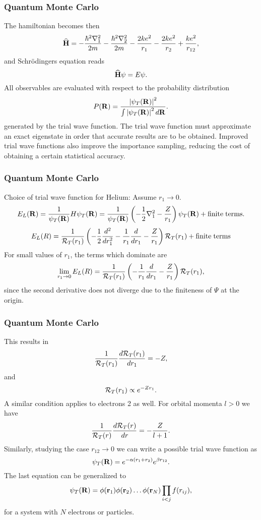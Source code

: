 \documentclass[compress]{beamer}
\newcommand{\OP}[1]{{\bf\widehat{#1}}}
\begin{document}
\frame
{
  \frametitle{Quantum Monte Carlo}
\begin{small}
{\scriptsize
The hamiltonian becomes then
\[
   \OP{H}=-\frac{\hbar^2\nabla_1^2}{2m}-\frac{\hbar^2\nabla_2^2}{2m}
          -\frac{2ke^2}{r_1}-\frac{2ke^2}{r_2}+
               \frac{ke^2}{r_{12}},
\]
and  Schr\"odingers equation reads
\[
   \OP{H}\psi=E\psi.
\]
All observables are evaluated with respect to the probability distribution
\[
   P({\bf R})= \frac{\left|\psi_T({\bf R})\right|^2}{\int \left|\psi_T({\bf R})\right|^2d{\bf R}}.
\]
generated by the trial wave function.   
The trial wave function must approximate an exact 
eigenstate in order that accurate results are to be obtained. 
Improved trial
wave functions also improve the importance sampling, 
reducing the cost of obtaining a certain statistical accuracy. 
}
\end{small}
}


\frame
{
  \frametitle{Quantum Monte Carlo}
\begin{small}
{\scriptsize
Choice of trial wave function for Helium:
Assume $r_1 \rightarrow 0$.
\[
   E_L({\bf R})=\frac{1}{\psi_T({\bf R})}H\psi_T({\bf R})=
     \frac{1}{\psi_T({\bf R})}\left(-\frac{1}{2}\nabla^2_1
     -\frac{Z}{r_1}\right)\psi_T({\bf R}) + \mathrm{finite \hspace{0.1cm}terms}.
\]
\[ 
    E_L(R)=
    \frac{1}{{\cal R}_T(r_1)}\left(-\frac{1}{2}\frac{d^2}{dr_1^2}-
     \frac{1}{r_1}\frac{d}{dr_1}
     -\frac{Z}{r_1}\right){\cal R}_T(r_1) + \mathrm{finite\hspace{0.1cm} terms}
\]
For small values of $r_1$, the terms which dominate are
\[ 
    \lim_{r_1 \rightarrow 0}E_L(R)=
    \frac{1}{{\cal R}_T(r_1)}\left(-
     \frac{1}{r_1}\frac{d}{dr_1}
     -\frac{Z}{r_1}\right){\cal R}_T(r_1),
\]
since the second derivative does not diverge due to the finiteness of 
$\Psi$ at the origin.
}
\end{small}
}


\frame
{
\frametitle{Quantum Monte Carlo}
\begin{small}
{\scriptsize
This results in
\[
     \frac{1}{{\cal R}_T(r_1)}\frac{d {\cal R}_T(r_1)}{dr_1}=-Z,
\]
and
\[
   {\cal R}_T(r_1)\propto e^{-Zr_1}.
\]
A similar condition applies to electrons 2 as well. 
For orbital momenta $l > 0$ we have 
\[
     \frac{1}{{\cal R}_T(r)}\frac{d {\cal R}_T(r)}{dr}=-\frac{Z}{l+1}.
\]
Similarly, studying the case $r_{12}\rightarrow 0$ we can write 
a possible trial wave function as
\[
   \psi_T({\bf R})=e^{-\alpha(r_1+r_2)}e^{\beta r_{12}}.
    \label{eq:wavehelium2}
\]
The last equation can be generalized to
\[
   \psi_T({\bf R})=\phi({\bf r}_1)\phi({\bf r}_2)\dots\phi({\bf r}_N)
                   \prod_{i< j}f(r_{ij}),
\]
for a system with $N$ electrons or particles. 
}
\end{small}
}
\end{document}
